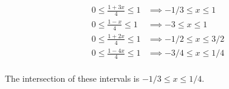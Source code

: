 \documentclass[10pt, oneside]{article}   	%
\theoremstyle{definition}
\begin{document}
\begin{enumerate}[label=4.\arabic*]
\begin{align*}
0 \leq \frac{1 + 3x}{4} \leq 1 &\implies -1/3 \leq x \leq 1 \\
0 \leq \frac{1 - x}{4} \leq 1 &\implies -3 \leq x \leq 1 \\
0 \leq \frac{1 + 2x}{4} \leq 1 &\implies -1/2 \leq x \leq 3/2 \\
0 \leq \frac{1 - 4x}{4} \leq 1 &\implies -3/4 \leq x \leq 1/4 \\
\end{align*}

The intersection of these intervals is $\boxed{-1/3 \leq x \leq 1/4}$.

\end{enumerate}
\end{document}
